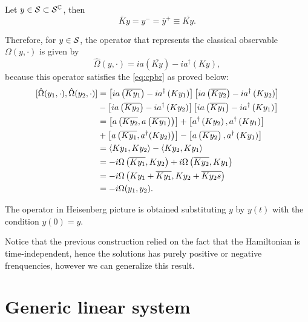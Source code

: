Let \(y\in{\mathcal{S}}\subset{\mathcal{S}}^{\mathbb{C}}\), then
\begin{equation}
    \overline{K}y=y^-=\overline{y}^+\equiv\overline{Ky}.
\end{equation}

Therefore, for \(y\in{\mathcal{S}}\), the operator that represents the classical observable \(\Omega(y,\cdot)\) is given by
\begin{equation}
    \hat{\Omega}(y,\cdot)=ia\left(\overline{Ky}\right)-ia^{\dagger}\left(Ky\right),
\end{equation}
because this operator satisfies the \cref{eq:cpbr} as proved below:
\begin{subequations}
    \begin{align}
        \relax[\hat{\Omega}(y_1,\cdot),\hat{\Omega}(y_2,\cdot)]&=\left[ia\left(\overline{Ky_1}\right)-ia^{\dagger}\left(Ky_1\right)\right]\left[ia\left(\overline{Ky_2}\right)-ia^{\dagger}\left(Ky_2\right)\right]\\
        &-\left[ia\left(\overline{Ky_2}\right)-ia^{\dagger}\left(Ky_2\right)\right]\left[ia\left(\overline{Ky_1}\right)-ia^{\dagger}\left(Ky_1\right)\right]\\
        &=\left[a\left(\overline{Ky_2},a\left(\overline{Ky_1}\right)\right)\right]+\left[a^{\dagger}\left(Ky_2\right),a^{\dagger}\left(Ky_1\right)\right]\\
        &+\left[a\left(\overline{Ky_1},a^{\dagger}(Ky_2)\right)\right]-\left[a\left(\overline{Ky_2}\right),a^{\dagger}\left(Ky_1\right)\right]\\
        &=\langle Ky_1,Ky_2\rangle-\langle Ky_2,Ky_1\rangle\\
        &=-i\Omega\left(\overline{Ky_1},Ky_2\right)+i\Omega\left(\overline{Ky_2},Ky_1\right)\\
        &=-i\Omega\left(Ky_1+\overline{Ky_1},Ky_2+\overline{Ky_2s}\right)\\
        &=-i\Omega(y_1,y_2).
    \end{align}
\end{subequations}

The operator in Heisenberg picture is obtained substituting \(y\) by \(y(t)\) with the condition \(y(0)=y\). 

Notice that the previous construction relied on the fact that the Hamiltonian is time-independent, hence the solutions has purely positive or negative frenquencies, however we can generalize this result.

\section{Generic linear system}

